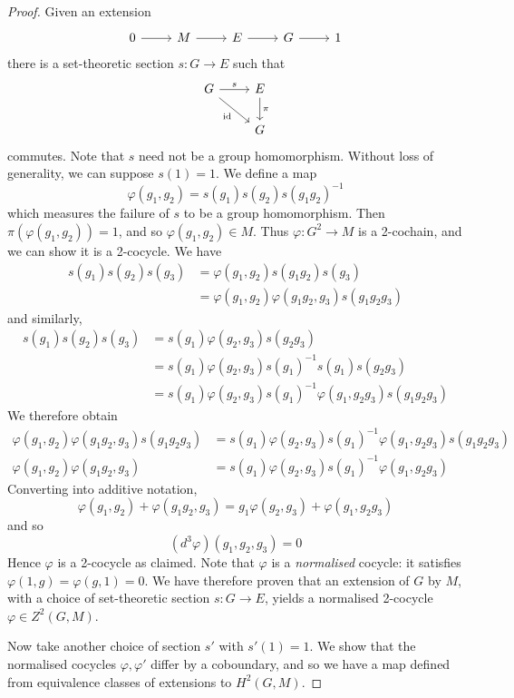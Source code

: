 \begin{proof}
    Given an extension
\[\begin{tikzcd}
	0 & M & E & G & 1
	\arrow[from=1-1, to=1-2]
	\arrow[from=1-2, to=1-3]
	\arrow[from=1-3, to=1-4]
	\arrow[from=1-4, to=1-5]
\end{tikzcd}\]
    there is a set-theoretic section \( s : G \to E \) such that
\[\begin{tikzcd}
	G & E \\
	& G
	\arrow["s", from=1-1, to=1-2]
	\arrow["\pi", from=1-2, to=2-2]
	\arrow["\id"', from=1-1, to=2-2]
\end{tikzcd}\]
    commutes.
    Note that \( s \) need not be a group homomorphism.
    Without loss of generality, we can suppose \( s(1) = 1 \).
    We define a map
    \[ \varphi(g_1, g_2) = s(g_1)s(g_2)s(g_1 g_2)^{-1} \]
    which measures the failure of \( s \) to be a group homomorphism.
    Then \( \pi(\varphi(g_1, g_2)) = 1 \), and so \( \varphi(g_1, g_2) \in M \).
    Thus \( \varphi : G^2 \to M \) is a 2-cochain, and we can show it is a 2-cocycle.
    We have
    \begin{align*}
        s(g_1) s(g_2) s(g_3) &= \varphi(g_1, g_2) s(g_1 g_2) s(g_3) \\
        &= \varphi(g_1, g_2) \varphi(g_1 g_2, g_3) s(g_1 g_2 g_3)
    \end{align*}
    and similarly,
    \begin{align*}
        s(g_1) s(g_2) s(g_3) &= s(g_1) \varphi(g_2, g_3) s(g_2 g_3) \\
        &= s(g_1) \varphi(g_2, g_3) s(g_1)^{-1} s(g_1) s(g_2 g_3) \\
        &= s(g_1) \varphi(g_2, g_3) s(g_1)^{-1} \varphi(g_1, g_2 g_3) s(g_1 g_2 g_3)
    \end{align*}
    We therefore obtain
    \begin{align*}
        \varphi(g_1, g_2) \varphi(g_1 g_2, g_3) s(g_1 g_2 g_3) &= s(g_1) \varphi(g_2, g_3) s(g_1)^{-1} \varphi(g_1, g_2 g_3) s(g_1 g_2 g_3) \\
        \varphi(g_1, g_2) \varphi(g_1 g_2, g_3) &= s(g_1) \varphi(g_2, g_3) s(g_1)^{-1} \varphi(g_1, g_2 g_3)
    \end{align*}
    Converting into additive notation,
    \[ \varphi(g_1, g_2) + \varphi(g_1 g_2, g_3) = g_1 \varphi(g_2, g_3) + \varphi(g_1, g_2 g_3) \]
    and so
    \[ (d^3 \varphi)(g_1, g_2, g_3) = 0 \]
    Hence \( \varphi \) is a 2-cocycle as claimed.
    Note that \( \varphi \) is a \emph{normalised} cocycle: it satisfies \( \varphi(1, g) = \varphi(g, 1) = 0 \).
    We have therefore proven that an extension of \( G \) by \( M \), with a choice of set-theoretic section \( s : G \to E \), yields a normalised 2-cocycle \( \varphi \in Z^2(G, M) \).

    Now take another choice of section \( s' \) with \( s'(1) = 1 \).
    We show that the normalised cocycles \( \varphi, \varphi' \) differ by a coboundary, and so we have a map defined from equivalence classes of extensions to \( H^2(G, M) \).
\end{proof}
